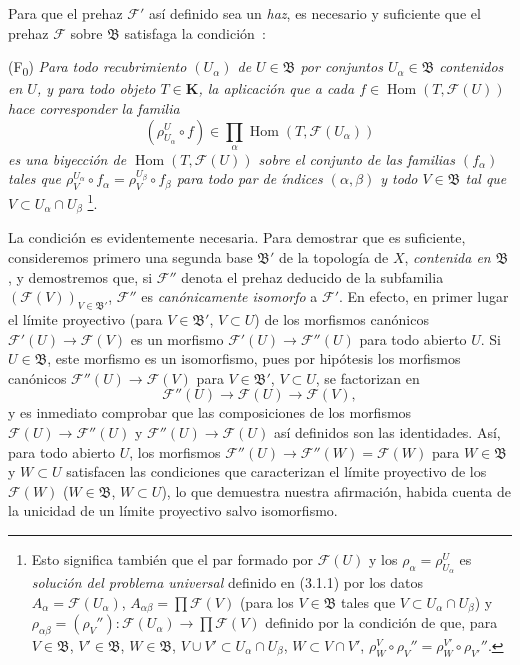 \begin{env}[3.2.2]
\label{0.3.2.2-fr}
Para que el prehaz $\mathcal{F}'$ así definido sea un \emph{haz},
es necesario y suficiente que el prehaz $\mathcal{F}$ sobre $\mathfrak{B}$
satisfaga la condición~:

\smallskip
\noindent
\textup{(F\textsubscript{0})} \emph{Para todo recubrimiento $(U_\alpha)$ de
$U\in\mathfrak{B}$ por conjuntos $U_\alpha\in\mathfrak{B}$ contenidos en
$U$, y para todo objeto $T\in\boldsymbol{K}$, la aplicación que a cada
$f\in\operatorname{Hom}(T,\mathcal{F}(U))$ hace corresponder la familia
\[
  (\rho_{U_\alpha}^{U}\circ f)
  \in\prod_\alpha\operatorname{Hom}(T,\mathcal{F}(U_\alpha))
\]
es una biyección de $\operatorname{Hom}(T,\mathcal{F}(U))$ sobre el conjunto de las
familias $(f_\alpha)$ tales que
$\rho_V^{U_\alpha}\circ f_\alpha=\rho_V^{U_\beta}\circ f_\beta$ para todo
par de índices $(\alpha,\beta)$ y todo $V\in\mathfrak{B}$ tal que
$V\subset U_\alpha\cap U_\beta$}%
\footnote{Esto significa también que el par formado por $\mathcal{F}(U)$ y los
$\rho_\alpha=\rho_{U_\alpha}^{U}$ es \emph{solución del problema universal}
definido en (3.1.1) por los datos
$A_\alpha=\mathcal{F}(U_\alpha)$,
$A_{\alpha\beta}=\prod\mathcal{F}(V)$ (para los $V\in\mathfrak{B}$ tales que
$V\subset U_\alpha\cap U_\beta$) y
$\rho_{\alpha\beta}=(\rho_V''):\mathcal{F}(U_\alpha)\to
\prod\mathcal{F}(V)$ definido por la condición de que, para
$V\in\mathfrak{B}$, $V'\in\mathfrak{B}$, $W\in\mathfrak{B}$,
$V\cup V'\subset U_\alpha\cap U_\beta$, $W\subset V\cap V'$,
$\rho_W^V\circ\rho_V''=\rho_W^{V'}\circ\rho_{V'}''$.}.

La condición es evidentemente necesaria. Para demostrar que es suficiente,
consideremos primero una segunda base $\mathfrak{B}'$ de la topología de $X$,
\emph{contenida en $\mathfrak{B}$}, y demostremos que, si $\mathcal{F}''$
denota el prehaz deducido de la subfamilia
$(\mathcal{F}(V))_{V\in\mathfrak{B}'}$, $\mathcal{F}''$ es
\emph{canónicamente isomorfo} a $\mathcal{F}'$. En efecto, en primer lugar el
límite proyectivo (para $V\in\mathfrak{B}'$, $V\subset U$) de los morfismos
canónicos $\mathcal{F}'(U)\to\mathcal{F}(V)$ es un morfismo
$\mathcal{F}'(U)\to\mathcal{F}''(U)$ para todo abierto $U$. Si
$U\in\mathfrak{B}$, este morfismo es un isomorfismo, pues por hipótesis los
morfismos canónicos $\mathcal{F}''(U)\to\mathcal{F}(V)$ para
$V\in\mathfrak{B}'$, $V\subset U$, se factorizan en
\[
  \mathcal{F}''(U)\to\mathcal{F}(U)\to\mathcal{F}(V),
\]
y es inmediato comprobar que las composiciones de los morfismos
$\mathcal{F}(U)\to\mathcal{F}''(U)$ y
$\mathcal{F}''(U)\to\mathcal{F}(U)$ así definidos son las identidades. Así,
para todo abierto $U$, los morfismos
$\mathcal{F}''(U)\to\mathcal{F}''(W)=\mathcal{F}(W)$ para
$W\in\mathfrak{B}$ y $W\subset U$ satisfacen las condiciones que caracterizan el
límite proyectivo de los $\mathcal{F}(W)$ ($W\in\mathfrak{B}$, $W\subset U$), lo
que demuestra nuestra afirmación, habida cuenta de la unicidad de un límite proyectivo
salvo isomorfismo.


\end{env}
